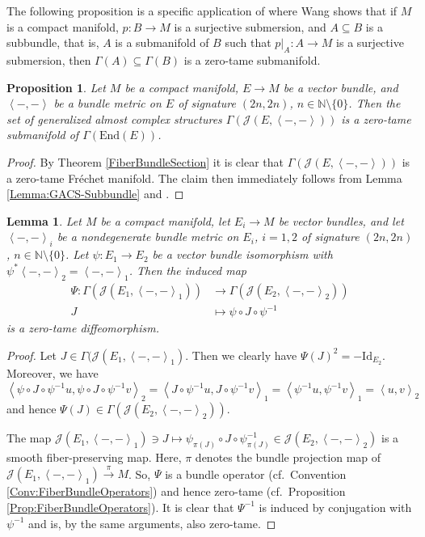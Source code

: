 \documentclass[12pt,a4paper]{article}
\theoremstyle{plain}
\newtheorem{lemma}[theorem]{Lemma}
\newtheorem{proposition}[theorem]{Proposition}
\theoremstyle{definition}
\newcommand{\N}{\mathbb{N}}
\newcommand{\scal}[2]{\left\langle #1,#2\right\rangle}
\newcommand{\Jcal}{\mathcal{J}}
\begin{document}
The following proposition is a specific application of \cite[Lemma 3.2.11]{RWang} where Wang shows that if $M$ is a compact manifold, $p:B\to M$ is a surjective submersion, and $A\subseteq B$ is a subbundle, that is, $A$ is a submanifold of $B$ such that $\left.p\right|_A:A\to M$ is a surjective submersion, then $\Gamma(A)\subseteq \Gamma(B)$ is a zero-tame submanifold.
\begin{proposition}
\label{Proposition:GACSZeroTameSubmfd}
Let $M$ be a compact manifold, $E\to M$ be a vector bundle, and $\scal{-}{-}$ be a bundle metric on $E$ of signature $(2n,2n)$, $n\in \N\setminus\{0\}$. Then the set of generalized almost complex structures $\Gamma(\Jcal(E,\scal{-}{-}))$ is a zero-tame submanifold of $\Gamma(\mathrm{End}(E))$.
\end{proposition}
\begin{proof}
By Theorem \ref{FiberBundleSection} it is clear that $\Gamma(\Jcal(E,\scal{-}{-}))$ is a zero-tame Fréchet manifold.
The claim then immediately follows from Lemma \ref{Lemma:GACS-Subbundle} and \cite[Lemma 3.2.11]{RWang}.
\end{proof}


\begin{lemma}
\label{Lemma:IsoClassesOfGACS}
Let $M$ be a compact manifold, let $E_i\to M$ be vector bundles, and let $\scal{-}{-}_i$ be a nondegenerate bundle metric on $E_i$, $i=1,2$ of signature $(2n,2n)$, $n\in \N\setminus\{0\}$. Let $\psi:E_1\to E_2$ be a vector bundle isomorphism with $\psi^*\scal{-}{-}_2=\scal{-}{-}_1$. Then the induced map 
\begin{align*}
    \Psi:\Gamma(\Jcal(E_1,\scal{-}{-}_1))&\longrightarrow \Gamma(\Jcal(E_2,\scal{-}{-}_2))\\
    J&\longmapsto \psi\circ J\circ \psi^{-1}
\end{align*}
is a zero-tame diffeomorphism. 
\end{lemma}
\begin{proof}
Let $J\in \Gamma(\Jcal(E_1,\scal{-}{-}_1)$. Then we clearly have $\Psi(J)^2=-\mathrm{Id}_{E_2}$. Moreover, we have $\scal{\psi\circ J\circ\psi^{-1}u}{\psi\circ J\circ\psi^{-1}v}_2=\scal{J\circ\psi^{-1}u}{ J\circ\psi^{-1}v}_1=\scal{\psi^{-1}u}{\psi^{-1}v}_1=\scal{u}{v}_2$ and hence $\Psi(J)\in \Gamma(\Jcal(E_2,\scal{-}{-}_2))$.

The map $\Jcal(E_1,\scal{-}{-}_1)\ni J\mapsto \psi_{\pi(J)}\circ J\circ \psi^{-1}_{\pi(J)}\in \Jcal(E_2,\scal{-}{-}_2)$ is a smooth fiber-preserving map. Here, $\pi$ denotes the bundle projection map of $\Jcal(E_1,\scal{-}{-}_1)\xrightarrow{\pi} M$. So, $\Psi$ is a bundle operator (cf.~Convention \ref{Conv:FiberBundleOperators}) and hence zero-tame (cf.~Proposition \ref{Prop:FiberBundleOperators}). It is clear that $\Psi^{-1}$ is induced by conjugation with $\psi^{-1}$ and is, by the same arguments, also zero-tame.
\end{proof}
\end{document}
